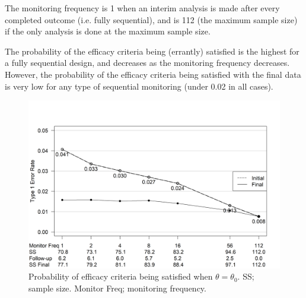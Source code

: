 \documentclass[useAMS,usenatbib,referee]{biom}
\begin{document}
The monitoring frequency is 1 when an interim analysis is made after every completed outcome (i.e. fully sequential), and is 112 (the maximum sample size) if the only analysis is done at the maximum sample size. 

The probability of the efficacy criteria being (errantly) satisfied is the highest for a fully sequential design, and decreases as the monitoring frequency decreases. However, the probability of the efficacy criteria being satisfied with the final data is very low for any type of sequential monitoring (under 0.02 in all cases).
\begin{figure}\begin{center}

    \includegraphics[width=6in]{../00-paper/FIGURES/figure4.png}
    \caption{Probability of efficacy criteria being satisfied when $\theta=\theta_0$. SS; sample size. Monitor Freq; monitoring frequency.}
	\label{fig:ex1t1e}

 
\end{center}
\end{figure}
\end{document}
